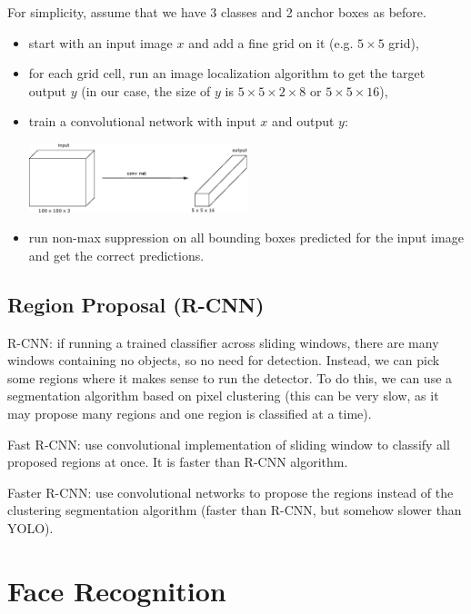 \documentclass[a4paper,11pt]{report}
\begin{document}
For simplicity, assume that we have 3 classes and 2 anchor boxes as before.

\begin{itemize}
  \item start with an input image $x$ and add a fine grid on it (e.g. $5\times 5$ grid), 
  \item for each grid cell, run an image localization algorithm to get the target output $y$ (in our case, the size of $y$ is $5\times 5 \times 2 \times 8$ or $5\times 5 \times 16$),
  \item train a convolutional network with input $x$ and output $y$:
    \begin{center}
    \includegraphics[width = 2.5in]{convolutions/yolo_target_alg}
    \end{center}
  \item run non-max suppression on all bounding boxes predicted for the input image and get the correct predictions.    
\end{itemize}


\subsection*{Region Proposal (R-CNN)}

R-CNN: if running a trained classifier across sliding windows, there are many windows containing no objects, so no need for detection. Instead, we can pick some regions where it makes sense to run the detector. To do this, we can use a segmentation algorithm based on pixel clustering (this can be very slow, as it may propose many regions and one region is classified at a time).

Fast R-CNN: use convolutional implementation of sliding window to classify all proposed regions at once. It is faster than R-CNN algorithm. 

Faster R-CNN: use convolutional networks to propose the regions instead of the clustering segmentation algorithm (faster than R-CNN, but somehow slower than YOLO).


\section{Face Recognition}
\end{document}
